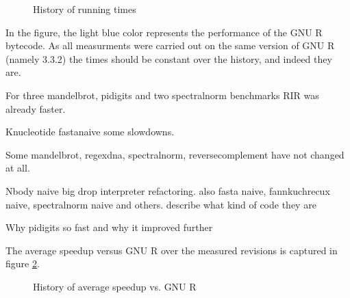 \begin{figure}[htbp]
  \caption{\label{fig:history}History of running times}
  \centering
\end{figure}

In the figure, the light blue color represents the performance of the GNU R bytecode. As all measurments were carried out on the same version of GNU R (namely 3.3.2) the times should be constant over the history, and indeed they are.

For three mandelbrot, pidigits and two spectralnorm benchmarks RIR was already faster.

Knucleotide fastanaive some slowdowns.

Some mandelbrot, regexdna, spectralnorm, reversecomplement have not changed at all.

Nbody naive  big drop interpreter refactoring. also fasta naive, fannkuchrecux naive, spectralnorm naive and others. describe what kind of code they are

Why pidigits so fast and why it improved further

The average speedup versus GNU R over the measured revisions is captured in figure \ref{fig:avg-speedup-history}.

\begin{figure}[htbp]
  \caption{\label{fig:avg-speedup-history}History of average speedup vs. GNU R}
  \centering
\end{figure}

